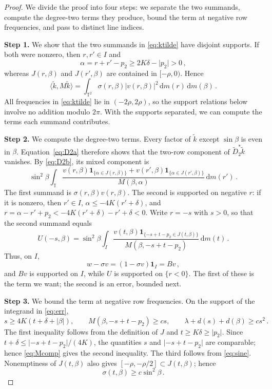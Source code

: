 \documentclass[11pt]{amsart}
\theoremstyle{plain}
\theoremstyle{definition}
\newcommand{\T}{\mathbb T}
\newcommand{\1}{\mathbf 1}
\newcommand{\ip}[2]{\langle #1,#2\rangle}
\newcommand{\abs}[1]{\lvert #1\rvert}
\newcommand{\dd}{\,\mathrm d}
\begin{document}
\begin{proof}
We divide the proof into four steps: we separate the two summands, compute
the degree-two terms they produce, bound the term at negative row
frequencies, and pass to distinct line indices.

\noindent\textbf{Step 1.}  We show that the two summands in \eqref{eq:ktilde} have
disjoint supports.  If both were nonzero, then $r,r'\in I$ and
\[
  \alpha=r+r'-p_2\geq2K\delta-\abs{p_2}>0\, ,
\]
whereas $J(r,\beta)$ and $J(r',\beta)$ are contained in $[-\rho,0)$.  Hence
\begin{equation}\label{eq:kenergy}
  \ip{\widetilde k}{M\widetilde k}
  =\int_{\T^2}\sigma(r,\beta)\abs{v(r,\beta)}^2
  \dd m(r)\dd m(\beta)\, .
\end{equation}
All frequencies in \eqref{eq:ktilde} lie in $(-2\rho,2\rho)$, so the support
relations below involve no addition modulo $2\pi$.  With the supports
separated, we can compute the terms each summand contributes.

\noindent\textbf{Step 2.}  We compute the degree-two terms.
Every factor of $\widetilde k$ except $\sin\beta$ is even in $\beta$.
Equation~\eqref{eq:D2a} therefore shows that the two-row component of
$\widetilde D_2^*\widetilde k$ vanishes.  By \eqref{eq:D2b}, its mixed
component is
\[
  \sin^2\beta\int_\T
  \frac{v(r,\beta)\1_{\{\alpha\in J(r,\beta)\}}
  +v(r',\beta)\1_{\{\alpha\in J(r',\beta)\}}}
  {M(\beta,\alpha)}\dd m(r')\, .
\]
The first summand is $\sigma(r,\beta)v(r,\beta)$.  The second is supported
on negative $r$: if it is nonzero, then $r'\in I$,
$\alpha\leq-4K(r'+\delta)$, and
$r=\alpha-r'+p_2<-4K(r'+\delta)-r'+\delta<0$.  Write $r=-s$ with $s>0$, so
that the second summand equals
\begin{equation}\label{eq:err}
  U(-s,\beta)=\sin^2\beta\int_I
  \frac{v(t,\beta)\1_{\{-s+t-p_2\in J(t,\beta)\}}}
  {M(\beta,-s+t-p_2)}\dd m(t)\, .
\end{equation}
Thus, on $I$,
\begin{equation}\label{eq:onI}
  w-\sigma v=(1-\sigma v)\1_I=Bv\, ,
\end{equation}
and $Bv$ is supported on $I$, while $U$ is supported on $\{r<0\}$.  The
first of these is the term we want; the second is an error, bounded next.

\noindent\textbf{Step 3.}  We bound the term at negative row frequencies.  On the
support of the integrand in
\eqref{eq:err},
\begin{equation}\label{eq:support}
  s\geq4K(t+\delta+\abs\beta),\qquad
  M(\beta,-s+t-p_2)\geq cs,\qquad
  \lambda+d(s)+d(\beta)\geq cs^2\, .
\end{equation}
The first inequality follows from the definition of $J$ and
$t\geq K\delta\geq\abs{p_2}$.  Since
$t+\delta\leq\abs{-s+t-p_2}/(4K)$, the quantities $s$ and
$\abs{-s+t-p_2}$ are comparable; hence \eqref{eq:Mcomp} gives the second
inequality.  The
third follows from \eqref{eq:sine}.  Nonemptiness of $J(t,\beta)$ also gives
$[-\rho,-\rho/2]\subset J(t,\beta)$; hence
\begin{equation}\label{eq:sigmalow}
  \sigma(t,\beta)\geq c\sin^2\beta\, .
\end{equation}


\end{proof}
\end{document}
